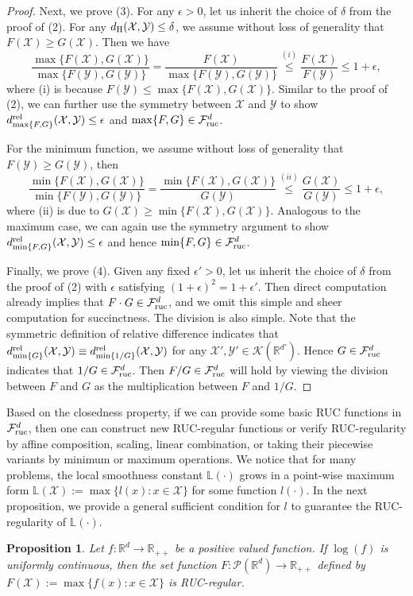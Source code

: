 \documentclass{article}
\newtheorem{proposition}[theorem]{Proposition}
\newcommand{\cX}{\mathcal{X}}
\newcommand{\cY}{\mathcal{Y}}
\newcommand{\cF}{\mathcal{F}}
\newcommand{\bL}{\mathbb{L}}
\newcommand{\RR}{\mathbb{R}}
\begin{document}
\begin{proof}
Next, we prove (3). For any $\epsilon>0$, let us inherit the choice of $\delta$ from the proof of (2). For any $d_{\rm H}(\cX,\cY)\leq\delta$, we assume without loss of generality that $F(\cX)\geq G(\cX)$. Then we have  
$$\frac{\max\{F(\cX),G(\cX)\}}{\max\{F(\cY),G(\cY)\}}=\frac{F(\cX)}{\max\{F(\cY),G(\cY)\}}\overset{(i)}{\leq}\frac{F(\cX)}{F(\cY)}\leq1+\epsilon,$$ where (i) is because $F(\cY)\leq\max\{F(\cX),G(\cX)\}$. Similar to the proof of (2), we can further use the symmetry between $\cX$ and $\cY$ to show $d_{\max\{F,G\}}^{\rm rel}(\cX,\cY)\leq\epsilon$ and $\max\{F,G\}\in\cF_{\rm ruc}^{d}$.

For the minimum function, we assume without loss of generality that $F(\cY)\geq G(\cY)$, then  
$$\frac{\min\{F(\cX),G(\cX)\}}{\min\{F(\cY),G(\cY)\}} = \frac{\min\{F(\cX),G(\cX)\}}{G(\cY)}\overset{(ii)}{\leq}\frac{G(\cX)}{G(\cY)}\leq 1+\epsilon,$$
where (ii) is due to $G(\cX)\geq\min\{F(\cX),G(\cX)\}$. Analogous to the maximum case, we can again use the symmetry argument to show $d_{\min\{F,G\}}^{\rm rel}(\cX,\cY)\leq\epsilon$ and hence $\min\{F,G\}\in\cF_{\rm ruc}^{d}$. 



Finally, we prove (4). Given any fixed $\epsilon'>0$, let us inherit the choice of $\delta$ from the proof of (2) with  $\epsilon$ satisfying 
$(1+\epsilon)^2 = 1+\epsilon'$. Then direct computation already implies that $F\cdot G\in\cF_{\rm ruc}^{d}$, and we omit this simple and sheer computation for succinctness. The division is also simple. Note that the symmetric definition of relative difference indicates that $d_{\min\{G\}}^{\rm rel}(\cX,\cY) \equiv d_{\min\{1/G\}}^{\rm rel}(\cX,\cY)$ for any $\cX',\cY'\in\mathcal{K}(\RR^{d'})$. Hence $G\in\cF_{\rm ruc}^{d}$ indicates that $1/G\in\cF_{\rm ruc}^{d}$. Then $F/G\in\cF_{\rm ruc}^{d}$ will hold by viewing the division between $F$ and $G$ as the multiplication between $F$ and $1/G$.
\end{proof}

Based on the closedness property, if we can provide some basic RUC functions in $\cF_{\rm ruc}^{d}$, then one can construct new RUC-regular functions or verify RUC-regularity by affine composition, scaling, linear combination, or taking their piecewise variants by minimum or maximum operations. We notice that for many problems, the local smoothness constant $\bL(\cdot)$ grows in a  point-wise maximum form $\bL(\cX):=\max\{l(x): x\in\cX\}$ for some function $l(\cdot)$. In the next proposition, we provide a general sufficient condition for $l$ to guarantee the RUC-regularity of $\bL(\cdot)$.  
\begin{proposition} 
\label{proposition:growth}
Let $f:\mathbb{R}^d\to \mathbb{R}_{++}$ be a positive valued function. If
$\log(f)$ is uniformly continuous, then the set function $F:\mathcal{P}(\mathbb{R}^d)\to\mathbb{R}_{++}$ defined by $F(\mathcal{X}) := \max\{f(x):x\in\mathcal{X}\}$
is RUC-regular.
\end{proposition}
\end{document}
